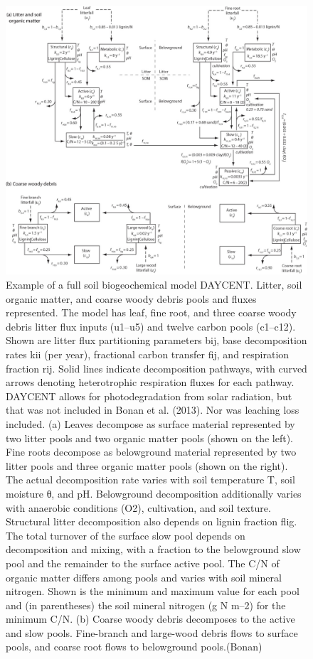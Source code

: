 \documentclass[
  12pt,
  oneside]{book}
\begin{document}
\begin{figure}

{\centering \includegraphics[width=0.8\linewidth]{figures/chap5/f518_daycent} 

}

\caption{Example of a full soil biogeochemical model DAYCENT. Litter, soil organic matter, and coarse woody debris pools and fluxes represented. The model has leaf, fine root, and three coarse woody debris litter flux inputs (u1–u5) and twelve carbon pools (c1–c12). Shown are litter flux partitioning parameters bij, base decomposition rates kii (per year), fractional carbon transfer fij, and respiration fraction rij. Solid lines indicate decomposition pathways, with curved arrows denoting heterotrophic respiration fluxes for each pathway. DAYCENT allows for photodegradation from solar radiation, but that was not included in Bonan et al. (2013). Nor was leaching loss included. (a) Leaves decompose as surface material represented by two litter pools and two organic matter pools (shown on the left). Fine roots decompose as belowground material represented by two litter pools and three organic matter pools (shown on the right). The actual decomposition rate varies with soil temperature T, soil moisture θ, and pH. Belowground decomposition additionally varies with anaerobic conditions (O2), cultivation, and soil texture. Structural litter decomposition also depends on lignin fraction flig. The total turnover of the surface slow pool depends on decomposition and mixing, with a fraction to the belowground slow pool and the remainder to the surface active pool. The C/N of organic matter differs among pools and varies with soil mineral nitrogen. Shown is the minimum and maximum value for each pool and (in parentheses) the soil mineral nitrogen (g N m–2) for the minimum C/N. (b) Coarse woody debris decomposes to the active and slow pools. Fine-branch and large-wood debris flows to surface pools, and coarse root flows to belowground pools.(Bonan)}\label{fig:f518}
\end{figure}
\end{document}
